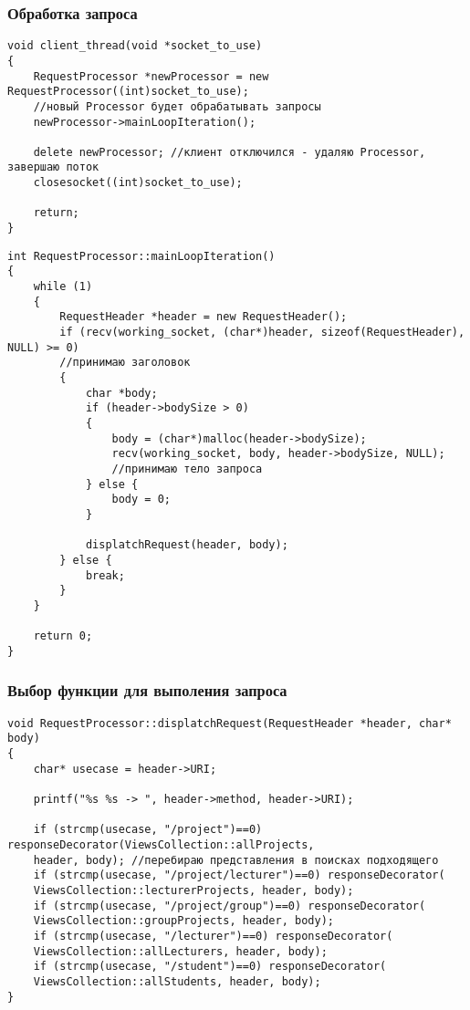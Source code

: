\subsubsection{Обработка запроса}
\begin{verbatim}
void client_thread(void *socket_to_use)
{
	RequestProcessor *newProcessor = new RequestProcessor((int)socket_to_use); 
	//новый Processor будет обрабатывать запросы
	newProcessor->mainLoopIteration();

	delete newProcessor; //клиент отключился - удаляю Processor, завершаю поток
	closesocket((int)socket_to_use);

	return;
}
\end{verbatim}
\begin{verbatim}
int RequestProcessor::mainLoopIteration()
{
	while (1)
	{
		RequestHeader *header = new RequestHeader();
		if (recv(working_socket, (char*)header, sizeof(RequestHeader), NULL) >= 0) 
		//принимаю заголовок
		{
			char *body;
			if (header->bodySize > 0)
			{
				body = (char*)malloc(header->bodySize);
				recv(working_socket, body, header->bodySize, NULL); 
				//принимаю тело запроса
			} else {
				body = 0;
			}

			displatchRequest(header, body);
		} else {
			break;
		}
	}

	return 0;
}
\end{verbatim}

\subsubsection{Выбор функции для выполения запроса}
\begin{verbatim}
void RequestProcessor::displatchRequest(RequestHeader *header, char* body)
{
	char* usecase = header->URI;
	
	printf("%s %s -> ", header->method, header->URI);

	if (strcmp(usecase, "/project")==0) responseDecorator(ViewsCollection::allProjects, 
	header, body); //перебираю представления в поисках подходящего
	if (strcmp(usecase, "/project/lecturer")==0) responseDecorator(
	ViewsCollection::lecturerProjects, header, body);
	if (strcmp(usecase, "/project/group")==0) responseDecorator(
	ViewsCollection::groupProjects, header, body);
	if (strcmp(usecase, "/lecturer")==0) responseDecorator(
	ViewsCollection::allLecturers, header, body);
	if (strcmp(usecase, "/student")==0) responseDecorator(
	ViewsCollection::allStudents, header, body);
}
\end{verbatim}

